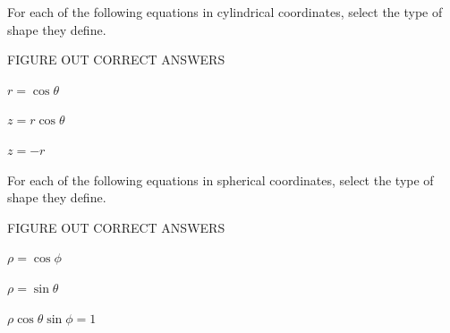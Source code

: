 \documentclass{ximera}
\begin{document}
\begin{problem}
For each of the following equations in cylindrical coordinates, select the type of shape they define.

FIGURE OUT CORRECT ANSWERS

$r = \cos\theta$
\begin{multipleChoice}
\end{multipleChoice}

$z = r\cos\theta$
\begin{multipleChoice}
\end{multipleChoice}

$z = -r$
\begin{multipleChoice}
\end{multipleChoice}
\end{problem}

\begin{problem}
For each of the following equations in spherical coordinates, select the type of shape they define.

FIGURE OUT CORRECT ANSWERS

$\rho = \cos\phi$
\begin{multipleChoice}
\end{multipleChoice}

$\rho = \sin\theta$
\begin{multipleChoice}
\end{multipleChoice}

$\rho\cos\theta\sin\phi = 1$
\begin{multipleChoice}
\end{multipleChoice}
\end{problem}
\end{document}
